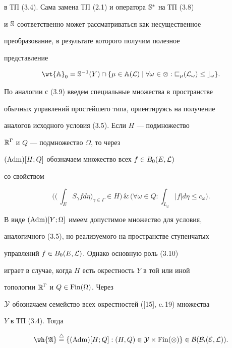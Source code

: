 в ТП (3.4). Сама замена ТП (2.1) и оператора $\Bbb S^*$ на ТП (3.8)


и $\Bbb S$ соответственно может рассматриваться как несущественное


преобразование, в результате которого получим полезное


представление


\begin{equation}


\wt{\Bbb A}_0=\Bbb S^{-1}(Y)\cap\{\mu\in


\Bbb A(\cal L)\mid\forall\omega\in\Omega:


v_\mu(L_\omega)\le c_\omega\}.


\end{equation}


По аналогии с (3.9) введем специальные множества в пространстве


обычных управлений простейшего типа, ориентируясь на получение


аналогов исходного условия (3.5). Если $H$ --- подмножество


$\Bbb R^\Gamma$ и $Q$ --- подмножество $\Omega$, то через


$(\operatorname{Adm})[H;Q]$ обозначаем множество всех $f\in B_0(E,\cal L)$


со свойством


\begin{equation}


\bigg(\Big(\,\int_E S_\gamma f d\eta\Big)_{\gamma \in \Gamma}\in H\bigg)


\,\&\,


\bigg(\forall\omega\in Q:\int_{L_\omega}|f|d\eta \le c_\omega\bigg).


\end{equation}


В виде $(\operatorname{Adm})[Y;\Omega]$ имеем допустимое множество для условия,


аналогичного (3.5), но реализуемого на пространстве ступенчатых


управлений $f\in B_0(E,\cal L)$. Однако основную роль (3.10)


играет в случае, когда $H$ есть окрестность $Y$ в той или иной


топологии $\Bbb R^\Gamma$ и $Q\in\operatorname{Fin}(\Omega)$. Через


$\cal Y$ обозначаем семейство всех окрестностей ([15], c.\,19) множества


$Y$ в ТП (3.4). Тогда


\begin{equation}


\wh{\frak A}\overset{\triangle}{=}{}\{(\Adm)[H;Q]:(H,Q)\in


\cal Y\times\Fin(\Omega)\}\in\cal B(B_0(E,\cal L)).


\end{equation}


